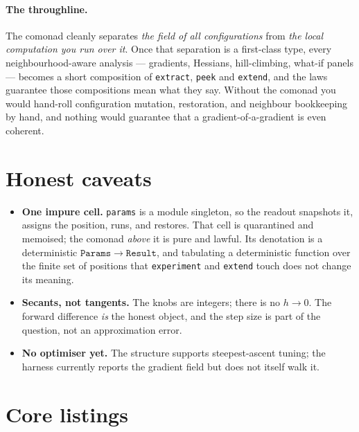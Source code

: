 \documentclass[11pt]{article}
\begin{document}
\paragraph{The throughline.} The comonad cleanly separates \emph{the field of all
configurations} from \emph{the local computation you run over it}. Once that
separation is a first-class type, every neighbourhood-aware analysis ---
gradients, Hessians, hill-climbing, what-if panels --- becomes a short
composition of \texttt{extract}, \texttt{peek} and \texttt{extend}, and the laws
guarantee those compositions mean what they say. Without the comonad you would
hand-roll configuration mutation, restoration, and neighbour bookkeeping by hand,
and nothing would guarantee that a gradient-of-a-gradient is even coherent.

\section{Honest caveats}

\begin{itemize}
\item \textbf{One impure cell.} \texttt{params} is a module singleton, so the
readout snapshots it, assigns the position, runs, and restores. That cell is
quarantined and memoised; the comonad \emph{above} it is pure and lawful. Its
denotation is a deterministic $\mathtt{Params} \to \mathtt{Result}$, and
tabulating a deterministic function over the finite set of positions that
\texttt{experiment} and \texttt{extend} touch does not change its meaning.
\item \textbf{Secants, not tangents.} The knobs are integers; there is no
$h \to 0$. The forward difference \emph{is} the honest object, and the step size
is part of the question, not an approximation error.
\item \textbf{No optimiser yet.} The structure supports steepest-ascent tuning;
the harness currently reports the gradient field but does not itself walk it.
\end{itemize}

\appendix
\section{Core listings}
\end{document}
